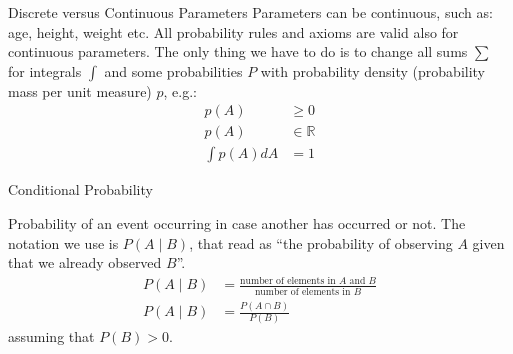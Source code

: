 \begin{frame}{Discrete versus Continuous Parameters}
	Parameters can be continuous, such as: age, height, weight etc. \vfill All probability rules and axioms are valid also for continuous parameters.
	\vfill
	The only thing we have to do is to change all sums $\sum$ for integrals $\int$ and some probabilities $P$ with probability density (probability mass per unit measure) $p$, e.g.:
	$$
		\begin{aligned}
			p(A)         & \geq 0         \\
			p(A)         & \in \mathbb{R} \\
			\int p(A) dA & = 1
		\end{aligned}
	$$

\end{frame}

\begin{frame}{Conditional Probability}
	\begin{defn}
		Probability of an event occurring in case another has occurred or not. \newline \newline
		The notation we use is $P( A \mid B )$, that read as ``the probability of
		observing $A$ given that we already observed $B$''. \newline \newline
		$$
			\begin{aligned}
				P(A \mid B) & = \frac{\text{number of elements in $A$ and $B$}}{\text{number of elements in $B$}} \\ P(A \mid B) & = \frac{P(A \cap B)}{P(B)}
			\end{aligned}
		$$ \newline \hspace{0.7\textwidth} {\footnotesize assuming that $P(B) > 0$}.
	\end{defn}
\end{frame}


